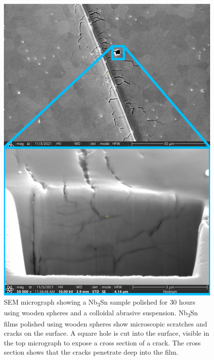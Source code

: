 \documentclass[reprint,amsmath,amssymb,aps]{revtex4-2}%
\begin{document}
%


\begin{figure}[t]%
\centering%
\includegraphics[width=0.8\columnwidth]{../doc/figs/Sample_Surface_Scratches.png}%
\caption{SEM micrograph showing a Nb\textsubscript{3}Sn sample polished for 30 hours using wooden spheres and a colloidal abrasive suspension. Nb\textsubscript{3}Sn films polished using wooden spheres show microscopic scratches and cracks on the surface. A square hole is cut into the surface, visible in the top micrograph to expose a cross section of a crack. The cross section shows that the cracks penetrate deep into the film.}%
\label{fig:samplesurfacescratches}%
\end{figure}

%
\end{document}

